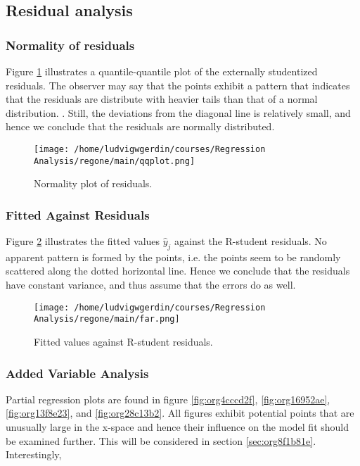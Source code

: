 \documentclass[11pt]{article}
\begin{document}


\subsection{Residual analysis}
\label{sec:org1e5ab03}
\subsubsection{Normality of residuals}
\label{sec:orgad42b79}

Figure \ref{fig:org7062c3e} illustrates a quantile-quantile plot of the externally studentized residuals.
The observer may say that the points exhibit a pattern that indicates that the residuals are distribute with
heavier tails than that of a normal distribution. \cite{Montgomery2012}. Still, the deviations from the
diagonal line is relatively small, and hence we conclude that the residuals are normally distributed.

\begin{figure}[htbp]
\centering
\texttt{[image: /home/ludvigwgerdin/courses/Regression Analysis/regone/main/qqplot.png]}
\caption{\label{fig:org7062c3e}
Normality plot of residuals.}
\end{figure}

\subsubsection{Fitted Against Residuals}
\label{sec:orga44e7e9}

Figure \ref{fig:orgb268c35} illustrates the fitted values \(\hat y_j\) against the R-student residuals. No apparent 
pattern is formed by the points, i.e. the points seem to be randomly scattered along the dotted horizontal
line. Hence we conclude that the residuals have constant variance, and thus assume that the errors do
as well.

\begin{figure}[htbp]
\centering
\texttt{[image: /home/ludvigwgerdin/courses/Regression Analysis/regone/main/far.png]}
\caption{\label{fig:orgb268c35}
Fitted values against R-student residuals.}
\end{figure}

\subsubsection{Added Variable Analysis}
\label{sec:orgcf273fe}

Partial regression plots are found in figure \ref{fig:org4cccd2f}, \ref{fig:org16952ae},
\ref{fig:org13f8e23}, and \ref{fig:org28c13b2}. All figures exhibit potential points 
that are unusually large in the x-space and hence their influence on the model fit should be 
examined further. This will be considered in section \ref{sec:org8f1b81e}.
Interestingly, 
\end{document}

